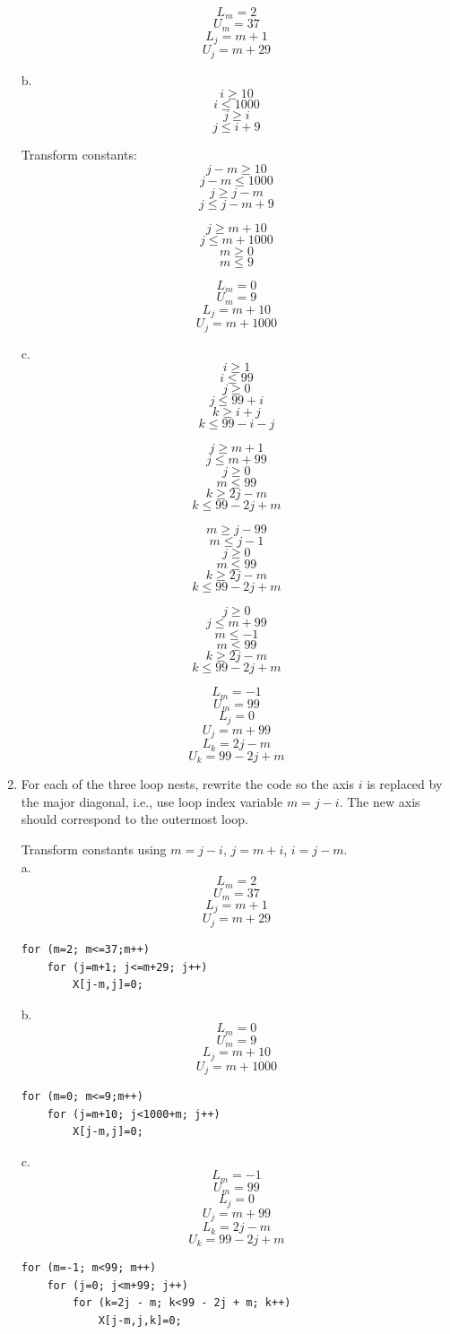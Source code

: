 \documentclass[11pt]{article}
\begin{document}
\begin{enumerate}
\begin{Answer}
		      $$L_m = 2$$
		      $$U_m = 37$$
		      $$L_j = m + 1$$
		      $$U_j = m + 29$$

		      b.
		      $$i \ge 10$$
		      $$i \le 1000$$
		      $$j \ge i$$
		      $$j \le i + 9$$

		      Transform constants:
		      $$j - m \ge 10$$
		      $$j - m \le 1000$$
		      $$j \ge j - m$$
		      $$j \le j - m + 9$$

		      $$j \ge m + 10$$
		      $$j \le m + 1000$$
		      $$m \ge 0$$
		      $$m \le 9$$

		      $$L_m = 0$$
		      $$U_m = 9$$
		      $$L_j = m + 10$$
		      $$U_j = m + 1000$$

		      c.
		      $$i \ge 1$$
		      $$i \le 99$$
		      $$j \ge 0$$
		      $$j \le 99 + i$$
		      $$k \ge i + j$$
		      $$k \le 99 - i - j$$

		      $$j \ge m + 1$$
		      $$j \le m + 99$$
		      $$j \ge 0$$
		      $$m \le 99$$
		      $$k \ge 2j - m$$
		      $$k \le 99 - 2j + m$$

		      $$m \ge j - 99$$
		      $$m \le j - 1$$
		      $$j \ge 0$$
		      $$m \le 99$$
		      $$k \ge 2j - m$$
		      $$k \le 99 - 2j + m$$

		      $$j \ge 0$$
		      $$j \le m + 99$$
		      $$m \le - 1$$
		      $$m \le 99$$
		      $$k \ge 2j - m$$
		      $$k \le 99 - 2j + m$$


		      $$L_m = -1$$
		      $$U_m = 99$$
		      $$L_j = 0$$
		      $$U_j = m + 99$$
		      $$L_k = 2j - m$$
		      $$U_k = 99 - 2j + m$$
	      \end{Answer}
	      \newpage
	\item For each of the three loop nests, rewrite the code so the axis $i$ is replaced by the major diagonal, i.e., use loop index variable $m=j-i$. The new axis should correspond to the outermost loop.
	      \begin{Answer}
		      Transform constants using $m=j -i$, $j = m + i$, $i = j - m$. \\
		      a.
		      $$L_m = 2$$
		      $$U_m = 37$$
		      $$L_j = m + 1$$
		      $$U_j = m + 29$$
		      \begin{verbatim}
for (m=2; m<=37;m++)
    for (j=m+1; j<=m+29; j++)
        X[j-m,j]=0;
\end{verbatim}

		      b.
		      $$L_m = 0$$
		      $$U_m = 9$$
		      $$L_j = m + 10$$
		      $$U_j = m + 1000$$

		      \begin{verbatim}
for (m=0; m<=9;m++) 
    for (j=m+10; j<1000+m; j++)
        X[j-m,j]=0;
\end{verbatim}
		      c.
		      $$L_m = -1$$
		      $$U_m = 99$$
		      $$L_j = 0$$
		      $$U_j = m + 99$$
		      $$L_k = 2j - m$$
		      $$U_k = 99 - 2j + m$$

		      \begin{verbatim}
for (m=-1; m<99; m++)
    for (j=0; j<m+99; j++)
        for (k=2j - m; k<99 - 2j + m; k++) 
            X[j-m,j,k]=0;
\end{verbatim}
	      \end{Answer}
\end{enumerate}
\end{document}

